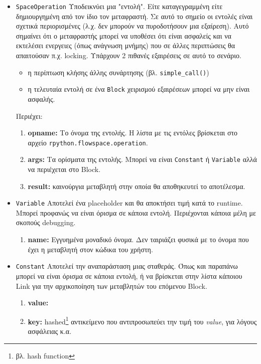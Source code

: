 \begin{itemize}
\item \texttt{SpaceOperation} Υποδεικνύει μια "εντολή". Είτε καταγεγραμμένη 
είτε δημιουργημένη από τον ίδιο τον μεταφραστή. Σε αυτό το σημείο οι εντολές 
είναι σχετικά περιορισμένες (λ.χ. δεν μπορούν να πυροδοτήσουν μια εξαίρεση).
Αυτό σημαίνει ότι ο μεταφραστής μπορεί να υποθέσει ότι είναι ασφαλείς και να
εκτελέσει ενεργειες (όπως ανάγνωση μνήμης) που σε άλλες περιπτώσεις θα
απαιτούσαν π.χ. locking. Υπάρχουν 2 πιθανές εξαιρέσεις σε αυτό το σενάριο.

\begin{itemize}
\item η περίπτωση κλήσης άλλης συνάρτησης (βλ. \texttt{simple\_call()})
\item η τελευταία εντολή σε ένα \texttt{Block} χειρισμού εξαιρέσεων μπορεί να
μην είναι ασφαλής.
\end{itemize}

Περιέχει:

\begin{enumerate}

\item \textbf{opname:} Το όνομα της εντολής. Η λίστα με τις εντόλες βρίσκεται 
στο αρχείο \texttt{rpython.flowspace.operation}.
\item \textbf{args:} Τα ορίσματα της εντολής. Μπορεί να είναι \texttt{Constant}
ή \texttt{Variable} αλλά να περιέχεται στο Block.
\item \textbf{result:} καινούργια μεταβλητή στην οποία θα αποθηκευτεί το 
αποτέλεσμα.
\end{enumerate}

\item \texttt{Variable} Αποτελεί ένα placeholder και θα αποκτήσει τιμή κατά το
runtime. Μπορεί προφανώς να είναι όρισμα σε κάποια εντολή. Περιέχονται κάποια 
μέλη με σκοπούς debugging.

\begin{enumerate}
\item \textbf{name:} Εγγυημένα μοναδικό όνομα. Δεν ταιριάζει φυσικά με το 
όνομα που έχει η μεταβλητή στον κώδικα του χρήστη.
\end{enumerate}

\item \texttt{Constant} Αποτελεί την αναπαράσταση μιας σταθεράς. Όπως και 
παραπάνω μπορεί να είναι όρισμα σε κάποια εντολή, ή να βρίσκεται στην λίστα 
κάποιου Link για την αρχικοποίηση των μεταβλητών του επόμενου Block.

\begin{enumerate}
\item \textbf{value:}
\item \textbf{key:} hashed\footnote{βλ. hash function} αντικείμενο που 
αντιπροσωπεύει την τιμή του \textit{value}, για λόγους ασφάλειας κ.α.
\end{enumerate}

\end{itemize}

